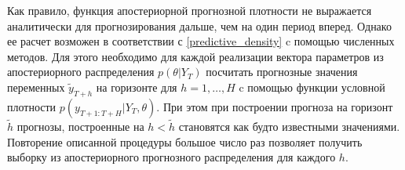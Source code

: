 \documentclass[11pt]{article} %
\begin{document}
Как правило, функция апостериорной прогнозной плотности не выражается аналитически для прогнозирования дальше, чем на один период вперед. Однако ее расчет возможен в соответствии с \eqref{predictive_density} c помощью численных методов. Для этого необходимо для каждой реализации вектора параметров из апостериорного распределения $p(\theta |Y_T)$ посчитать прогнозные значения переменных $\tilde y_{T+h}$ на горизонте для $h=1,\ldots, H$ c помощью функции условной плотности $p(y_{T+1:T+H}|Y_{T},\theta)$. При этом при построении прогноза на горизонт $\tilde h$ прогнозы, построенные на $h<\tilde h$ становятся как будто известными значениями. Повторение описанной процедуры большое число раз позволяет получить выборку из апостериорного прогнозного распределения для каждого $h$.
\end{document}
